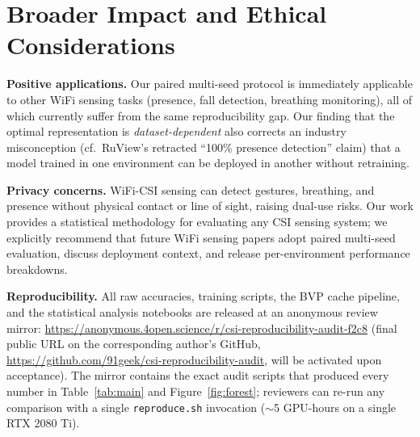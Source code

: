\documentclass[journal,11pt]{IEEEtran}
\begin{document}
\section*{Broader Impact and Ethical Considerations}
\textbf{Positive applications.} Our paired multi-seed protocol is immediately applicable to other WiFi sensing tasks (presence, fall detection, breathing monitoring), all of which currently suffer from the same reproducibility gap. Our finding that the optimal representation is \emph{dataset-dependent} also corrects an industry misconception (cf.\ RuView's retracted ``100\% presence detection'' claim) that a model trained in one environment can be deployed in another without retraining.

\textbf{Privacy concerns.} WiFi-CSI sensing can detect gestures, breathing, and presence without physical contact or line of sight, raising dual-use risks. Our work provides a statistical methodology for evaluating any CSI sensing system; we explicitly recommend that future WiFi sensing papers adopt paired multi-seed evaluation, discuss deployment context, and release per-environment performance breakdowns.

\textbf{Reproducibility.} All raw accuracies, training scripts, the BVP cache pipeline, and the statistical analysis notebooks are released at an anonymous review mirror: \url{https://anonymous.4open.science/r/csi-reproducibility-audit-f2c8} (final public URL on the corresponding author's GitHub, \url{https://github.com/91geek/csi-reproducibility-audit}, will be activated upon acceptance). The mirror contains the exact audit scripts that produced every number in Table~\ref{tab:main} and Figure~\ref{fig:forest}; reviewers can re-run any comparison with a single \texttt{reproduce.sh} invocation ($\sim$5 GPU-hours on a single RTX 2080 Ti).
\end{document}
